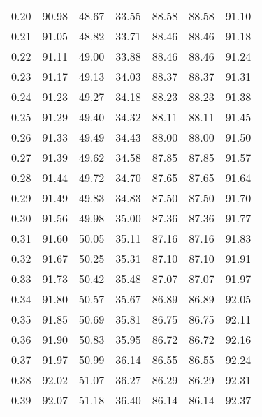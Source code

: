 \begin{tabular}{|c|c|c|c|c|c|c|}
      0.20 &     90.98 &     48.67 &      33.55 &   88.58 &      88.58 &         91.10 \\
      0.21 &     91.05 &     48.82 &      33.71 &   88.46 &      88.46 &         91.18 \\
      0.22 &     91.11 &     49.00 &      33.88 &   88.46 &      88.46 &         91.24 \\
      0.23 &     91.17 &     49.13 &      34.03 &   88.37 &      88.37 &         91.31 \\
      0.24 &     91.23 &     49.27 &      34.18 &   88.23 &      88.23 &         91.38 \\
      0.25 &     91.29 &     49.40 &      34.32 &   88.11 &      88.11 &         91.45 \\
      0.26 &     91.33 &     49.49 &      34.43 &   88.00 &      88.00 &         91.50 \\
      0.27 &     91.39 &     49.62 &      34.58 &   87.85 &      87.85 &         91.57 \\
      0.28 &     91.44 &     49.72 &      34.70 &   87.65 &      87.65 &         91.64 \\
      0.29 &     91.49 &     49.83 &      34.83 &   87.50 &      87.50 &         91.70 \\
      0.30 &     91.56 &     49.98 &      35.00 &   87.36 &      87.36 &         91.77 \\
      0.31 &     91.60 &     50.05 &      35.11 &   87.16 &      87.16 &         91.83 \\
      0.32 &     91.67 &     50.25 &      35.31 &   87.10 &      87.10 &         91.91 \\
      0.33 &     91.73 &     50.42 &      35.48 &   87.07 &      87.07 &         91.97 \\
      0.34 &     91.80 &     50.57 &      35.67 &   86.89 &      86.89 &         92.05 \\
      0.35 &     91.85 &     50.69 &      35.81 &   86.75 &      86.75 &         92.11 \\
      0.36 &     91.90 &     50.83 &      35.95 &   86.72 &      86.72 &         92.16 \\
      0.37 &     91.97 &     50.99 &      36.14 &   86.55 &      86.55 &         92.24 \\
      0.38 &     92.02 &     51.07 &      36.27 &   86.29 &      86.29 &         92.31 \\
      0.39 &     92.07 &     51.18 &      36.40 &   86.14 &      86.14 &         92.37 \\

\end{tabular}
